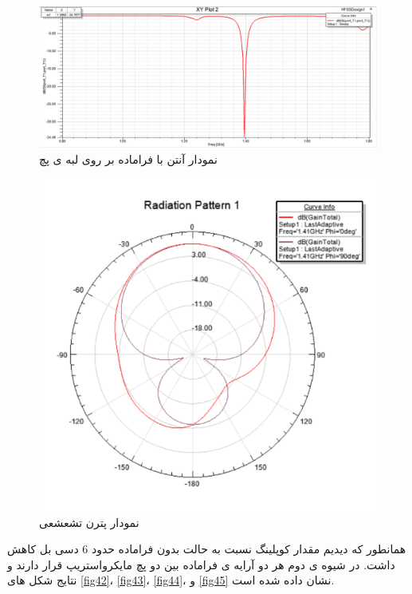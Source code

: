 \begin{figure}
	\centering
	\includegraphics[scale=0.5]{Images/fig40a.jpg}
	\caption{
	 نمودار
	  آنتن با فراماده بر روی لبه ی پچ
}
\end{figure}


\begin{figure}
	\centering
	\includegraphics[scale=0.5]{Images/fig41.png}
	\caption{نمودار پترن تشعشعی}
	\label{fig41}
\end{figure}

همانطور که دیدیم مقدار کوپلینگ نسبت به حالت بدون فراماده حدود 6 دسی بل کاهش داشت. 
در شیوه ی دوم هر دو آرایه ی فراماده بین دو پچ مایکرواستریپ قرار دارند و نتایج شکل های
\ref{fig42}،
\ref{fig43}،
\ref{fig44}،
و
\ref{fig45}
نشان داده شده است.


